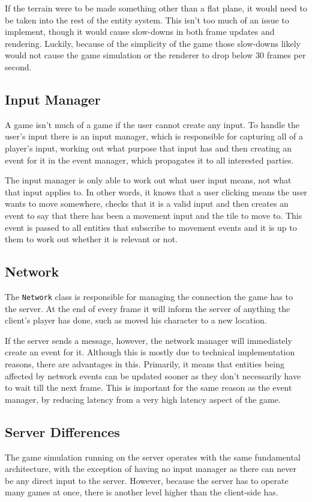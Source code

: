 If the terrain were to be made something other than a flat plane, it would need to be taken into the rest of the entity system. This isn't too much of an issue to implement, though it would cause slow-downs in both frame updates and rendering. Luckily, because of the simplicity of the game those slow-downs likely would not cause the game simulation or the renderer to drop below 30 frames per second.

\subsection{Input Manager}
A game isn't much of a game if the user cannot create any input. To handle the user's input there is an input manager, which is responsible for capturing all of a player's input, working out what purpose that input has and then creating an event for it in the event manager, which propagates it to all interested parties.

The input manager is only able to work out what user input means, not what that input applies to. In other words, it knows that a user clicking means the user wants to move somewhere, checks that it is a valid input and then creates an event to say that there has been a movement input and the tile to move to. This event is passed to all entities that subscribe to movement events and it is up to them to work out whether it is relevant or not.

\subsection{Network}
The \texttt{Network} class is responsible for managing the connection the game has to the server. At the end of every frame it will inform the server of anything the client's player has done, such as moved his character to a new location.

If the server sends a message, however, the network manager will immediately create an event for it. Although this is mostly due to technical implementation reasons, there are advantages in this. Primarily, it means that entities being affected by network events can be updated sooner as they don't necessarily have to wait till the next frame. This is important for the same reason as the event manager, by reducing latency from a very high latency aspect of the game.

\subsection{Server Differences}
The game simulation running on the server operates with the same fundamental architecture, with the exception of having no input manager as there can never be any direct input to the server. However, because the server has to operate many games at once, there is another level higher than the client-side has.

